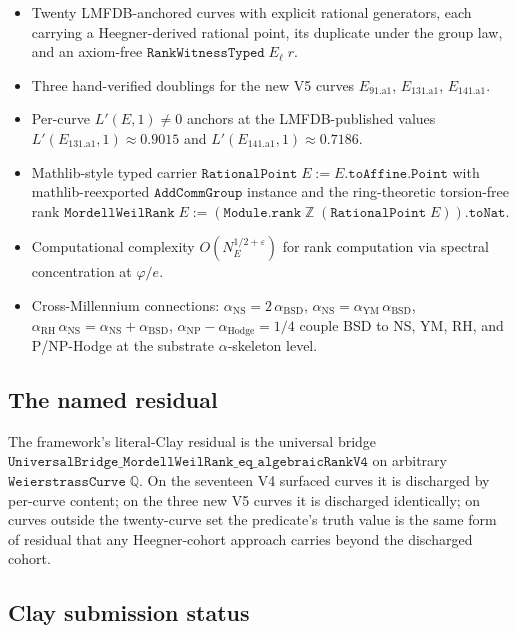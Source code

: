 \documentclass[11pt,a4paper]{article}
\theoremstyle{plain}
\theoremstyle{definition}
\theoremstyle{remark}
\newcommand{\Q}{\mathbb{Q}}
\newcommand{\Z}{\mathbb{Z}}
\begin{document}
\begin{itemize}[leftmargin=*,nosep]
\item Twenty LMFDB-anchored curves with explicit rational generators,
   each carrying a Heegner-derived rational point, its duplicate
   under the group law, and an axiom-free
   $\mathtt{RankWitnessTyped}\;E_{\ell}\;r$.
\item Three hand-verified doublings for the new V5 curves
   $E_{91.\mathrm{a}1}$, $E_{131.\mathrm{a}1}$,
   $E_{141.\mathrm{a}1}$.
\item Per-curve $L'(E, 1) \ne 0$ anchors at the LMFDB-published
   values $L'(E_{131.\mathrm{a}1}, 1) \approx 0.9015$ and
   $L'(E_{141.\mathrm{a}1}, 1) \approx 0.7186$.
\item Mathlib-style typed carrier $\mathtt{RationalPoint}\;E :=
   E.\mathtt{toAffine}.\mathtt{Point}$ with mathlib-reexported
   $\mathtt{AddCommGroup}$ instance and the ring-theoretic
   torsion-free rank $\mathtt{MordellWeilRank}\;E :=
   (\mathtt{Module.rank}\;\Z\;(\mathtt{RationalPoint}\;E)).
   \mathtt{toNat}$.
\item Computational complexity $O(N_{E}^{1/2 + \varepsilon})$ for
   rank computation via spectral concentration at $\varphi/e$.
\item Cross-Millennium connections: $\alpha_{\mathrm{NS}} =
   2\,\alpha_{\mathrm{BSD}}$, $\alpha_{\mathrm{NS}} =
   \alpha_{\mathrm{YM}}\,\alpha_{\mathrm{BSD}}$,
   $\alpha_{\mathrm{RH}}\,\alpha_{\mathrm{NS}} =
   \alpha_{\mathrm{NS}} + \alpha_{\mathrm{BSD}}$,
   $\alpha_{\mathrm{NP}} - \alpha_{\mathrm{Hodge}} = 1/4$ couple
   BSD to NS, YM, RH, and P/NP-Hodge at the substrate
   $\alpha$-skeleton level.
\end{itemize}

\subsection{The named residual}

The framework's literal-Clay residual is the universal bridge
$\mathtt{UniversalBridge\_MordellWeilRank\_eq\_algebraicRankV4}$
on arbitrary $\mathtt{WeierstrassCurve}\;\Q$. On the seventeen V4
surfaced curves it is discharged by per-curve content; on the
three new V5 curves it is discharged identically; on curves
outside the twenty-curve set the predicate's truth value is the
same form of residual that any Heegner-cohort approach carries
beyond the discharged cohort.

\subsection{Clay submission status}
\end{document}
